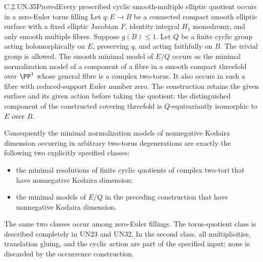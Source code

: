 \begin{statement}{C.2.UN.35}{Proved}{Every prescribed cyclic smooth-multiple elliptic quotient occurs in a zero-Euler torus filling}
Let $q:E\to B$ be a connected compact smooth elliptic
surface with a fixed elliptic Jacobian $F$, identity
integral $H_1$ monodromy, and only smooth multiple
fibres. Suppose $g(B)\le1$. Let $Q$ be a finite
cyclic group acting holomorphically on $E$, preserving
$q$, and acting faithfully on $B$. The trivial group
is allowed. The smooth minimal model of $E/Q$ occurs
as the minimal normalization model of a component of
a fibre in a smooth compact threefold over $\PP^1$
whose general fibre is a complex two-torus. It also
occurs in such a fibre with reduced-support Euler
number zero. The construction retains the given
surface and its given action before taking the
quotient: the distinguished component of the
constructed covering threefold is $Q$-equivariantly
isomorphic to $E$ over $B$.

Consequently the minimal normalization models of
nonnegative Kodaira dimension occurring in arbitrary
two-torus degenerations are exactly the following
two explicitly specified classes:
\begin{itemize}
\item the minimal resolutions of finite cyclic
quotients of complex two-tori that have nonnegative
Kodaira dimension;
\item the minimal models of $E/Q$ in the preceding
construction that have nonnegative Kodaira dimension.
\end{itemize}
The same two classes occur among zero-Euler fillings.
The torus-quotient class is described completely in
UN23 and UN32. In the second class, all multiplicities,
translation gluing, and the cyclic action are part
of the specified input; none is discarded by the
occurrence construction.
\end{statement}

